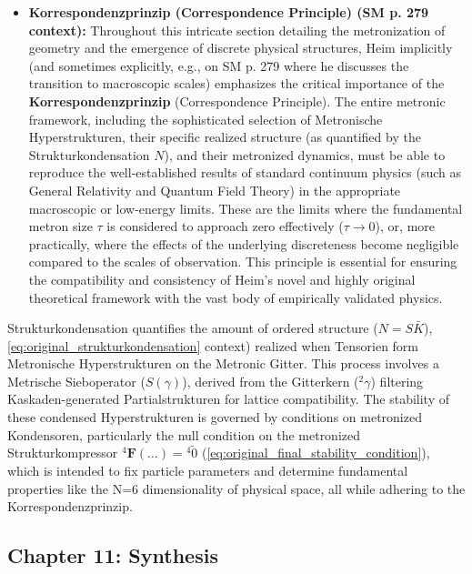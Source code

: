 \documentclass[12pt]{article}
\newcommand{\metron}{\tau}
\newcommand{\metrischesieboperator}{S(\gamma)}
\newcommand{\metronisiertekondensor}[1]{{}^{#1}\mathbf{F}}
\begin{document}
\begin{itemize}
    \item \textbf{Korrespondenzprinzip (Correspondence Principle) (SM p. 279 context):}
    Throughout this intricate section detailing the metronization of geometry and the emergence of discrete physical structures, Heim implicitly (and sometimes explicitly, e.g., on SM p. 279 where he discusses the transition to macroscopic scales) emphasizes the critical importance of the \textbf{Korrespondenzprinzip} (Correspondence Principle). The entire metronic framework, including the sophisticated selection of Metronische Hyperstrukturen, their specific realized structure (as quantified by the Strukturkondensation \( N \)), and their metronized dynamics, must be able to reproduce the well-established results of standard continuum physics (such as General Relativity and Quantum Field Theory) in the appropriate macroscopic or low-energy limits. These are the limits where the fundamental metron size \( \metron \) is considered to approach zero effectively (\(\metron \to 0 \)), or, more practically, where the effects of the underlying discreteness become negligible compared to the scales of observation. This principle is essential for ensuring the compatibility and consistency of Heim's novel and highly original theoretical framework with the vast body of empirically validated physics.
\end{itemize}

Strukturkondensation quantifies the amount of ordered structure (\(N = S\bar{K}\)), \eqref{eq:original_strukturkondensation} context) realized when Tensorien form Metronische Hyperstrukturen on the Metronic Gitter. This process involves a Metrische Sieboperator (\(\metrischesieboperator\)), derived from the Gitterkern (\({}^2\gamma\)) filtering Kaskaden-generated Partialstrukturen for lattice compatibility. The stability of these condensed Hyperstrukturen is governed by conditions on metronized Kondensoren, particularly the null condition on the metronized Strukturkompressor \( \metronisiertekondensor{4}(\dots) = {}^{4}\tilde{0} \) (\eqref{eq:original_final_stability_condition}), which is intended to fix particle parameters and determine fundamental properties like the N=6 dimensionality of physical space, all while adhering to the Korrespondenzprinzip.

\subsection{Chapter 11: Synthesis}
\label{sec:chapter11_synthesis}
\end{document}
